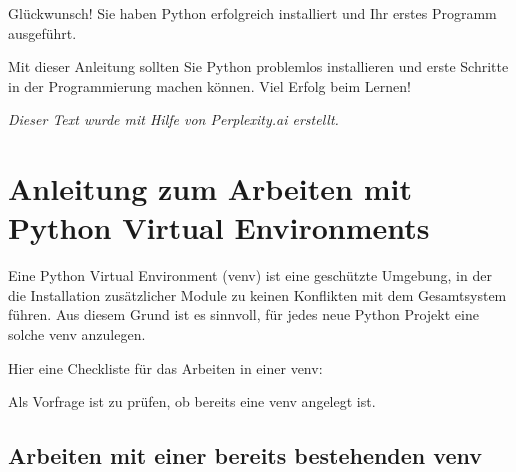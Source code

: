 \documentclass[
  nswissgerman,
  a4paper,
  DIV=11,
  numbers=noendperiod,
  ngerman]{scrreprt}
\begin{document}
Glückwunsch! Sie haben Python erfolgreich installiert und Ihr erstes
Programm ausgeführt.

Mit dieser Anleitung sollten Sie Python problemlos installieren und
erste Schritte in der Programmierung machen können. Viel Erfolg beim
Lernen!

\emph{Dieser Text wurde mit Hilfe von Perplexity.ai erstellt.}

\chapter{Anleitung zum Arbeiten mit Python Virtual
Environments}\label{anleitung-zum-arbeiten-mit-python-virtual-environments}

Eine Python Virtual Environment (venv) ist eine geschützte Umgebung, in
der die Installation zusätzlicher Module zu keinen Konflikten mit dem
Gesamtsystem führen. Aus diesem Grund ist es sinnvoll, für jedes neue
Python Projekt eine solche venv anzulegen.

Hier eine Checkliste für das Arbeiten in einer venv:

Als Vorfrage ist zu prüfen, ob bereits eine venv angelegt ist.

\section{Arbeiten mit einer bereits bestehenden
venv}\label{arbeiten-mit-einer-bereits-bestehenden-venv}
\end{document}
